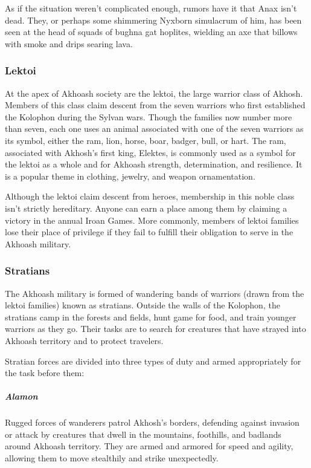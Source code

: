         As if the situation weren't complicated enough, rumors have it that Anax isn't dead.
        They, or perhaps some shimmering Nyxborn simulacrum of him, has been seen at the head of squads of bughna gat hoplites, wielding an axe that billows with smoke and drips searing lava.

    \subsubsection{Lektoi}
        At the apex of Akhoash society are the lektoi, the large warrior class of Akhosh.
        Members of this class claim descent from the seven warriors who first established the Kolophon during the Sylvan wars.
        Though the families now number more than seven, each one uses an animal associated with one of the seven warriors as its symbol, either the ram, lion, horse, boar, badger, bull, or hart.
        The ram, associated with Akhosh's first king, Elektes, is commonly used as a symbol for the lektoi as a whole and for Akhoash strength, determination, and resilience.
        It is a popular theme in clothing, jewelry, and weapon ornamentation. %

        Although the lektoi claim descent from heroes, membership in this noble class isn't strictly hereditary.
        Anyone can earn a place among them by claiming a victory in the annual Iroan Games.
        More commonly, members of lektoi families lose their place of privilege if they fail to fulfill their obligation to serve in the Akhoash military.

    \subsubsection{Stratians}
        The Akhoash military is formed of wandering bands of warriors (drawn from the lektoi families) known as stratians.
        Outside the walls of the Kolophon, the stratians camp in the forests and fields, hunt game for food, and train younger warriors as they go.
        Their tasks are to search for creatures that have strayed into Akhoash territory and to protect travelers.

        Stratian forces are divided into three types of duty and armed appropriately for the task before them:

        \subparagraph{Alamon} Rugged forces of wanderers patrol Akhosh's borders, defending against invasion or attack by creatures that dwell in the mountains, foothills, and badlands around Akhoash territory.
        They are armed and armored for speed and agility, allowing them to move stealthily and strike unexpectedly.

